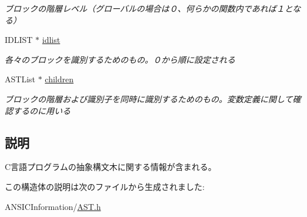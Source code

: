 \begin{DoxyCompactItemize}
\begin{DoxyCompactList}\small\item\em ブロックの階層レベル（グローバルの場合は０、何らかの関数内であれば１となる） \item\end{DoxyCompactList}\item 
IDLIST $\ast$ \hyperlink{structabstract__syntax__tree_a9207cfa97354e44aae39c4686a924357}{idlist}\label{structabstract__syntax__tree_a9207cfa97354e44aae39c4686a924357}

\begin{DoxyCompactList}\small\item\em 各々のブロックを識別するためのもの。０から順に設定される \item\end{DoxyCompactList}\item 
ASTList $\ast$ \hyperlink{structabstract__syntax__tree_ab5e78b5322a2bab5b0aa21d40522a78b}{children}\label{structabstract__syntax__tree_ab5e78b5322a2bab5b0aa21d40522a78b}

\begin{DoxyCompactList}\small\item\em ブロックの階層および識別子を同時に識別するためのもの。変数定義に関して確認するのに用いる \item\end{DoxyCompactList}\end{DoxyCompactItemize}


\subsection{説明}
C言語プログラムの抽象構文木に関する情報が含まれる。 

この構造体の説明は次のファイルから生成されました:\begin{DoxyCompactItemize}
\item 
ANSICInformation/\hyperlink{AST_8h}{AST.h}\end{DoxyCompactItemize}
